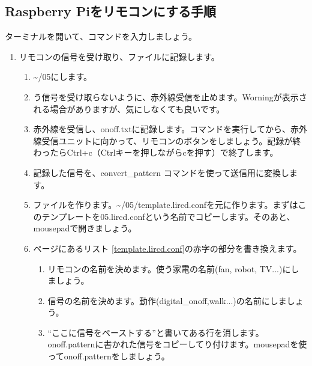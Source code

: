 \subsection{Raspberry Piをリモコンにする手順}
\noindent
ターミナルを開いて、コマンドを入力しましょう。
\begin{enumerate}
\item リモコンの信号を受け取り、ファイルに記録します。
 \begin{enumerate}[1]
  \item \textasciitilde /05にします。\\ 
  \item {}う信号を受け取らないように、赤外線受信を止めます。Worningが表示される場合がありますが、気にしなくても良いです。 \\ 
  \item 赤外線を受信し、onoff.txtに記録します。コマンドを実行してから、赤外線受信ユニットに向かって、リモコンのボタンをしましょう。記録が終わったらCtrl+c（Ctrlキーを押しながらcを押す）で終了します。\\ 
  \item 記録した信号を、convert\_pattern コマンドを使って送信用に変換します。\\ 
  \item {}ファイルを作ります。\textasciitilde /05/template.lircd.confを元に作ります。まずはこのテンプレートを05.lircd.confという名前でコピーします。そのあと、mousepadで開きましょう。\\ 
  \item \pageref{template.lircd.conf}ページにあるリスト \ref{template.lircd.conf}の赤字の部分を書き換えます。
  \begin{enumerate}[(1)]
    \item リモコンの名前を決めます。使う家電の名前(fan, robot, TV...)にしましょう。
    \item 信号の名前を決めます。動作(digital\_onoff,walk...)の名前にしましょう。
    \item “ここに信号をペーストする”と書いてある行を消します。onoff.patternに書かれた信号をコピーしてり付けます。mousepadを使ってonoff.patternをしましょう。\\ 

\end{enumerate}
\end{enumerate}
\end{enumerate}

